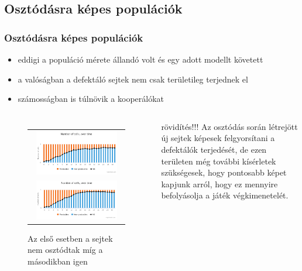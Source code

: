 \subsection{Osztódásra képes populációk}
\begin{frame}
	\frametitle{Osztódásra képes populációk}
	\begin{itemize}
		\item eddigi a populáció mérete állandó volt és egy adott modellt követett
		\item a valóságban a defektáló sejtek nem csak területileg terjednek el
		\item számosságban is túlnövik a kooperálókat
	\end{itemize}
	
	\begin{columns}
			\begin{figure}[ht]
				\centering
				\begin{tabular}{c}
					\includegraphics[width=0.9\textwidth]{images/nemosztodik}
					\\
					\includegraphics[width=0.9\textwidth]{images/osztodik}
				\end{tabular}
				\caption{Az első esetben a sejtek nem osztódtak míg a másodikban igen}				\label{fig:Divide}
			\end{figure}
			\begin{block}{}
				rövidítés!!!
				Az osztódás során létrejött új sejtek képesek felgyorsítani a defektálók terjedését, de ezen területen még további kísérletek szükségesek, hogy pontosabb képet kapjunk arról, hogy ez mennyire befolyásolja a játék végkimenetelét.
			\end{block}
	\end{columns}
\end{frame}

